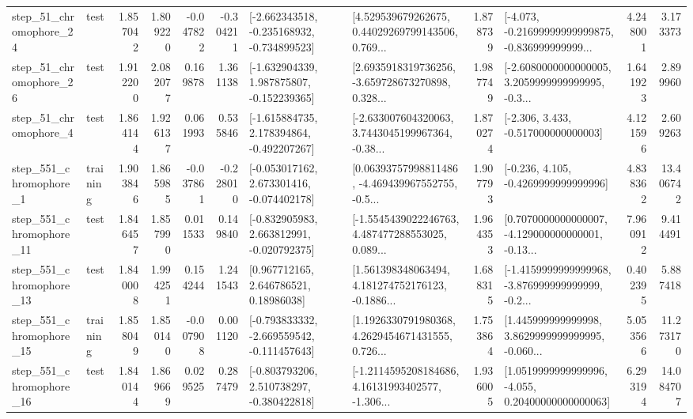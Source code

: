 \begin{tabular}{llrrrrllrlrr}
   step\_51\_chromophore\_24 &      test &      1.857042 &    1.809220 &     -0.047822 & -0.304211 &  [-2.662343518, -0.235168932, -0.734899523] &  [4.529539679262675, 0.44029269799143506, 0.769... &       1.878739 &  [-4.073, -0.21699999999999875, -0.836999999999... &            4.248001 &          3.173373 \\
   step\_51\_chromophore\_26 &      test &      1.912200 &    2.082077 &      0.169878 &  1.361138 &   [-1.632904339, 1.987875807, -0.152239365] &  [2.6935918319736256, -3.659728673270898, 0.328... &       1.987749 &  [-2.6080000000000005, 3.2059999999999995, -0.3... &            1.641923 &          2.899960 \\
    step\_51\_chromophore\_4 &      test &      1.864144 &    1.926137 &      0.061993 &  0.535846 &   [-1.615884735, 2.178394864, -0.492207267] &  [-2.633007604320063, 3.7443045199967364, -0.38... &       1.870274 &                [-2.306, 3.433, -0.517000000000003] &            4.121596 &          2.609263 \\
   step\_551\_chromophore\_1 &  training &      1.903846 &    1.865985 &     -0.037861 & -0.228010 &   [-0.053017162, 2.673301416, -0.074402178] &  [0.06393757998811486, -4.469439967552755, -0.5... &       1.907793 &               [-0.236, 4.105, -0.4269999999999996] &            4.838362 &         13.406742 \\
  step\_551\_chromophore\_11 &      test &      1.846457 &    1.857990 &      0.011533 &  0.149840 &   [-0.832905983, 2.663812991, -0.020792375] &  [-1.5545439022246763, 4.487477288553025, 0.089... &       1.964353 &  [0.7070000000000007, -4.129000000000001, -0.13... &            7.960912 &          9.414491 \\
  step\_551\_chromophore\_13 &      test &      1.840008 &    1.994251 &      0.154244 &  1.241543 &      [0.967712165, 2.646786521, 0.18986038] &  [1.561398348063494, 4.181274752176123, -0.1886... &       1.688315 &  [-1.4159999999999968, -3.876999999999999, -0.2... &            0.402395 &          5.887418 \\
  step\_551\_chromophore\_15 &  training &      1.858049 &    1.850140 &     -0.007908 &  0.001120 &  [-0.793833332, -2.669559542, -0.111457643] &  [1.1926330791980368, 4.2629454671431555, 0.726... &       1.753864 &  [1.445999999999998, 3.8629999999999995, -0.060... &            5.053566 &         11.273170 \\
  step\_551\_chromophore\_16 &      test &      1.840144 &    1.869669 &      0.029525 &  0.287479 &   [-0.803793206, 2.510738297, -0.380422818] &  [-1.2114595208184686, 4.16131993402577, -1.306... &       1.936005 &  [1.0519999999999996, -4.055, 0.20400000000000063] &            6.293194 &         14.084707 \\

\end{tabular}
